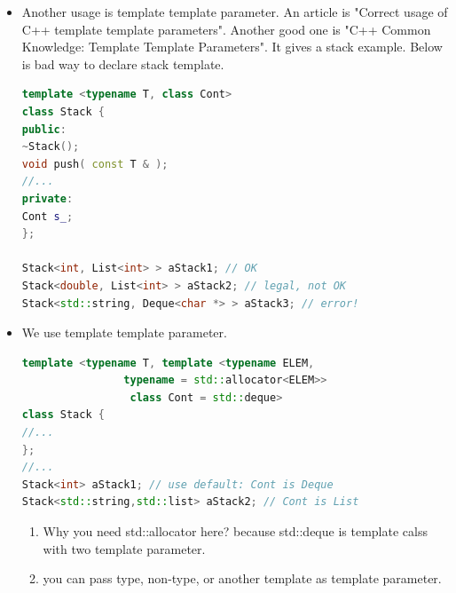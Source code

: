 \documentclass[a4paper,12pt,twoside]{book}
\begin{document}
\begin{itemize}
\item Another usage is template template parameter. An article is "Correct usage of C++ template template parameters". Another good one is "C++ Common Knowledge: Template Template Parameters". It gives a stack example. Below is bad way to declare stack template.
\begin{lstlisting}[frame=single, language=c++]
template <typename T, class Cont>
class Stack {
public:
~Stack();
void push( const T & );
//...
private:
Cont s_;
};

Stack<int, List<int> > aStack1; // OK
Stack<double, List<int> > aStack2; // legal, not OK           
Stack<std::string, Deque<char *> > aStack3; // error!   
\end{lstlisting}
\item We use template template parameter. 
\begin{lstlisting}[frame=single, language=c++]
template <typename T, template <typename ELEM,
				typename = std::allocator<ELEM>>
				 class Cont = std::deque>
class Stack {
//...
};
//...
Stack<int> aStack1; // use default: Cont is Deque
Stack<std::string,std::list> aStack2; // Cont is List
\end{lstlisting}
\begin{enumerate}
	\item Why you need std::allocator here? because std::deque is template calss with two template parameter.
	\item you can pass type, non-type, or another template as template parameter. 
	
\end{enumerate}

\end{itemize}
\end{document}
